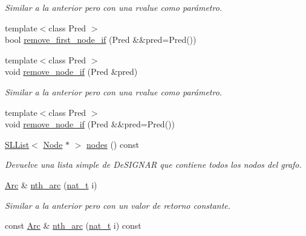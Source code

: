 \begin{DoxyCompactItemize}
\begin{DoxyCompactList}\small\item\em Similar a la anterior pero con una rvalue como parámetro. \end{DoxyCompactList}\item 
{\footnotesize template$<$class Pred $>$ }\\bool \hyperlink{class_designar_1_1_base_graph_aec049416b5240910cb04b1d6f55fcecf}{remove\+\_\+first\+\_\+node\+\_\+if} (Pred \&\&pred=Pred())
\item 
{\footnotesize template$<$class Pred $>$ }\\void \hyperlink{class_designar_1_1_base_graph_aae56ca6b3b936835d07275f2ceb4b0d1}{remove\+\_\+node\+\_\+if} (Pred \&pred)
\begin{DoxyCompactList}\small\item\em Similar a la anterior pero con una rvalue como parámetro. \end{DoxyCompactList}\item 
{\footnotesize template$<$class Pred $>$ }\\void \hyperlink{class_designar_1_1_base_graph_a6e63659d272255254f6abc29c1e09724}{remove\+\_\+node\+\_\+if} (Pred \&\&pred=Pred())
\item 
\hyperlink{class_designar_1_1_s_l_list}{S\+L\+List}$<$ \hyperlink{namespace_designar_a5af326c65aa2bd26b26c410f2030d09e}{Node} $\ast$ $>$ \hyperlink{class_designar_1_1_base_graph_a56b1ec4a0258d9f22542f33615bcdbea}{nodes} () const
\begin{DoxyCompactList}\small\item\em Devuelve una lista simple de De\+S\+I\+G\+N\+AR que contiene todos los nodos del grafo. \end{DoxyCompactList}\item 
\hyperlink{namespace_designar_a3f55fb5513d62ff47cbc8f72b8e95d6f}{Arc} \& \hyperlink{class_designar_1_1_base_graph_a3fed87a68cc763e63369558423235e00}{nth\+\_\+arc} (\hyperlink{namespace_designar_aa72662848b9f4815e7bf31a7cf3e33d1}{nat\+\_\+t} i)
\begin{DoxyCompactList}\small\item\em Similar a la anterior pero con un valor de retorno constante. \end{DoxyCompactList}\item 
const \hyperlink{namespace_designar_a3f55fb5513d62ff47cbc8f72b8e95d6f}{Arc} \& \hyperlink{class_designar_1_1_base_graph_aaff3c76e0e0094d4ec1eaecd155ca951}{nth\+\_\+arc} (\hyperlink{namespace_designar_aa72662848b9f4815e7bf31a7cf3e33d1}{nat\+\_\+t} i) const

\end{DoxyCompactItemize}
